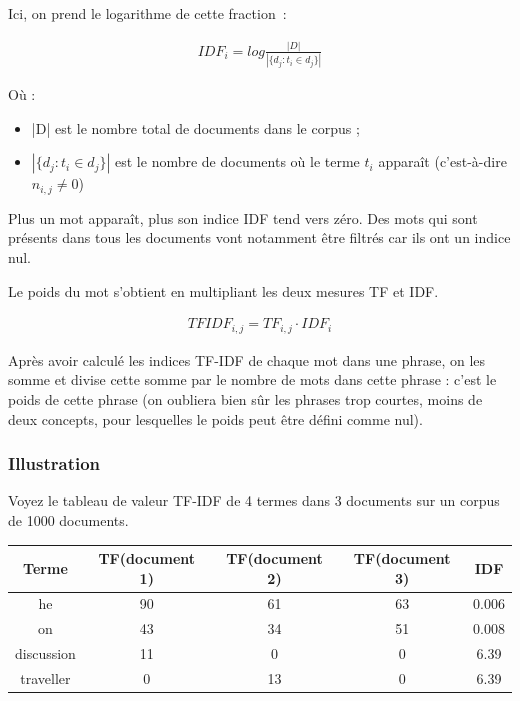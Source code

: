 \documentclass[a4paper, 12pt]{article}
\begin{document}
Ici, on prend le logarithme de cette fraction~:

\begin{align}
 IDF_{i} =  log \frac{|D|}{|\{d_{j}: t_{i} \in d_{j}\}|}
\end{align}

Où : 
\begin{itemize}
 \item |D| est le nombre total de documents dans le corpus ;
 \item $|\{d_{j} : t_{i} \in d_{j}\}|$ est le nombre de documents où le terme  $t_{i}$  apparaît (c'est-à-dire  $n_{i,j} \neq 0$)
\end{itemize}

Plus un mot apparaît, plus son indice IDF tend vers zéro. Des mots qui sont présents dans tous les documents vont notamment être filtrés car ils ont un indice nul.

\begin{definition}[TF-IDF]
Le poids du mot s'obtient en multipliant les deux mesures TF et IDF.
\end{definition}

\begin{align}
 TFIDF_{i,j} = TF_{i,j} \cdot  IDF_{i}
\end{align}

\begin{definition}
Après avoir calculé les indices TF-IDF de chaque mot dans une phrase, on les somme et divise cette somme par le nombre de mots dans cette phrase : c'est le poids de cette phrase (on oubliera bien sûr les phrases trop courtes, moins de deux concepts, pour lesquelles le poids peut être défini comme nul).
\end{definition}

\subsubsection{Illustration}
Voyez le tableau de valeur TF-IDF de 4 termes dans 3 documents sur un corpus de 1000 documents.
\begin{center}
	\begin{tabular}{|c|c|c|c|c|}
	 \hline
	 	Terme & TF(document 1) & TF(document 2) & TF(document 3) & IDF \\
	 \hline
	 	he & 90 & 61 & 63 & 0.006 \\
	 \hline
	 	on & 43 & 34 & 51 & 0.008 \\
	 \hline
	 	discussion & 11 & 0 & 0 & 6.39 \\
	 \hline
	 	traveller & 0 & 13 & 0 & 6.39 \\
	 \hline
	\end{tabular}
\end{center}
\end{document}
